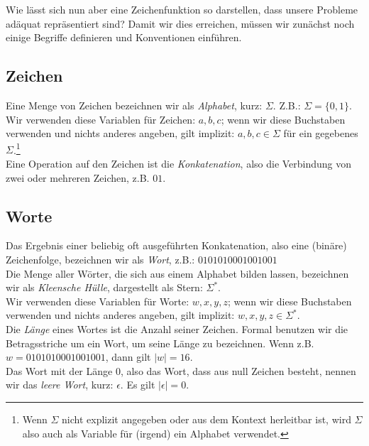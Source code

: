 Wie lässt sich nun aber eine Zeichenfunktion so darstellen,
dass unsere Probleme adäquat repräsentiert sind?
Damit wir dies erreichen,
müssen wir zunächst noch einige Begriffe definieren und Konventionen einführen.

\subsection{Zeichen}

Eine Menge von Zeichen bezeichnen wir als \emph{Alphabet}, kurz: $\Sigma$.
Z.B.: $\Sigma = \{0,1\}$.\\

\noindent
Wir verwenden diese Variablen für Zeichen: $a,b,c$;
wenn wir diese Buchstaben verwenden und nichts anderes angeben,
gilt implizit: $a, b, c \in \Sigma$ für ein gegebenes $\Sigma$.\footnote{
Wenn $\Sigma$ nicht explizit angegeben oder aus dem Kontext herleitbar ist,
wird $\Sigma$ also auch als Variable für (irgend) ein Alphabet verwendet.}\\

\noindent
Eine Operation auf den Zeichen ist die \emph{Konkatenation},
also die Verbindung von zwei oder mehreren Zeichen, z.B. $01$.

\subsection{Worte}
Das Ergebnis einer beliebig oft ausgeführten Konkatenation,
also eine (binäre) Zeichenfolge,
bezeichnen wir als \emph{Wort}, z.B.: $0101010001001001$\\

\noindent
Die Menge aller Wörter,
die sich aus einem Alphabet bilden lassen,
bezeichnen wir als \emph{Kleensche Hülle}, dargestellt als Stern: $\Sigma^*$.\\

\noindent
Wir verwenden diese Variablen für Worte:
$w, x, y, z$; wenn wir diese Buchstaben verwenden und nichts anderes angeben,
gilt implizit: $w, x, y, z \in \Sigma^*$.\\

\noindent
Die \emph{Länge} eines Wortes ist die Anzahl seiner Zeichen.
Formal benutzen wir die Betragsstriche um ein Wort, um seine
Länge zu bezeichnen. Wenn z.B. $w = 0101010001001001$, dann gilt $|w| = 16$.\\

\noindent
Das Wort mit der Länge 0, also das Wort, dass aus null Zeichen besteht,
nennen wir das \emph{leere Wort}, kurz: $\epsilon$.
Es gilt $|\epsilon| = 0$.\\

